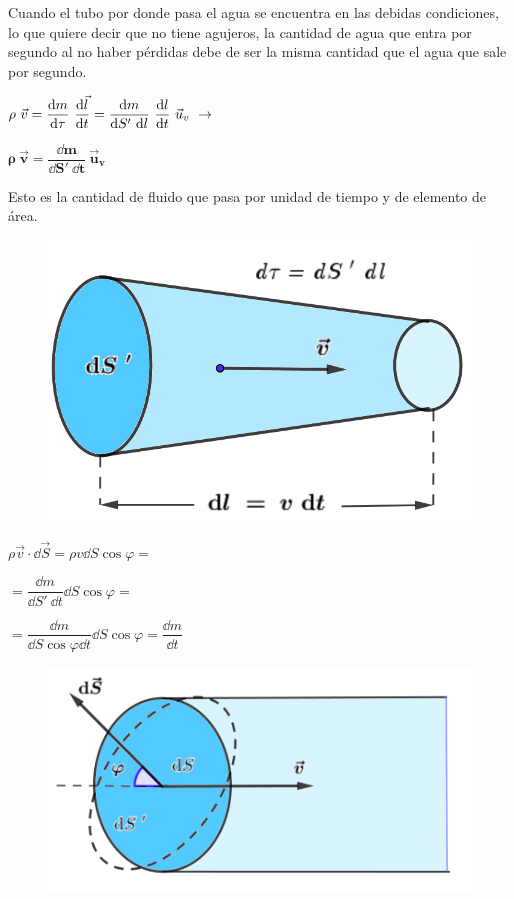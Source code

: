 \textcolor{gris}{Cuando el tubo por donde pasa el agua se encuentra en las debidas condiciones, lo que quiere decir que no tiene agujeros, la cantidad de agua que entra por segundo al no haber pérdidas debe de ser la misma cantidad que el agua que sale por segundo.}

\begin{multicols}{2}
$\displaystyle \rho \ \vec v=\dfrac {\dd m}{\dd \tau} \ \dv{\vec l}{t}= \dfrac {\dd m}{\dd S' \ \dd l} \ \dv{l}{t} \ \vec u_v \ \to $ 

$\boldsymbol{\rho \ \vec v = \dfrac{\dd m}{\dd S' \ \dd t} \ \vec u_v}$

Esto es la cantidad de fluido que pasa por unidad de tiempo y de elemento de área.

\begin{figure}[H]
	\centering
	\includegraphics[width=.5\textwidth]{imagenes/imagenes18/T18IM03.png}
	\end{figure}
\end{multicols}
\vspace{30mm} %
\begin{multicols}{2}
$\rho \vec v \cdot  \dd \vec S=\rho v \dd S \cos \varphi=$

$=\dfrac {\dd m}{\dd S'\ \dd t} \dd S \cos \varphi=$

$=\dfrac{\dd m}{\dd S \cos \varphi \dd t}\dd S \cos \varphi=\dfrac {\dd m}{\dd t}$
\begin{figure}[H]
	\centering
	\includegraphics[width=.5\textwidth]{imagenes/imagenes18/T18IM04.png}
	\end{figure}
\end{multicols}



